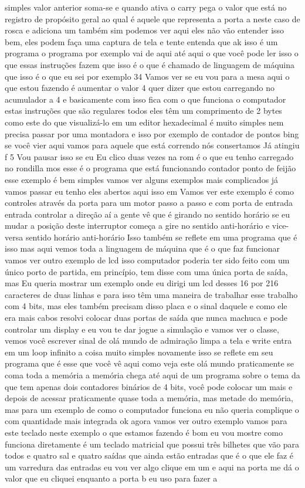 \documentclass[oneside,11pt]{memoir} %
\begin{document}
simples  valor anterior soma-se e quando  ativa o carry pega o valor que está  no registro de propósito geral ao qual é  aquele que representa a porta a neste  caso de rosca e adiciona um também  sim podemos ver aqui  eles não vão entender isso bem, eles podem  faça uma captura de tela e tente  entenda que ak isso é um  programa o programa por exemplo vai de  aqui até aqui o que você pode ler isso  o que essas instruções fazem que isso é  o que é chamado de linguagem de máquina  que isso é o que eu sei por exemplo 34  Vamos ver se eu vou para a mesa aqui  o que estou fazendo é aumentar o valor  4 quer dizer que estou carregando no  acumulador a 4 e basicamente com isso fica  com o que funciona o computador  estas instruções que são regulares  todos eles têm um comprimento de 2 bytes como este  do que visualizá-lo em um editor hexadecimal é  muito simples nem precisa  passar por uma montadora e isso por  exemplo de contador de pontos bing se você vier aqui  vamos para aquele que está correndo nós consertamos  Já atingiu f 5 Vou pausar isso se eu  Eu clico duas vezes na rom é o que eu tenho  carregado no rondilla mos esse é o  programa que está funcionando contador  ponto de feijão  esse exemplo é bem simples vamos ver  alguns exemplos mais complicados já  vamos passar eu tenho eles abertos aqui isso em  Vamos ver este exemplo é como  controles através da porta para um motor  passo a passo  e com porta de entrada entrada  controlar a direção aí a gente vê que é  girando no sentido horário se eu mudar  a posição deste interruptor começa a  gire no sentido anti-horário e vice-versa  sentido horário anti-horário  Isso também se reflete em uma  programa que é isso mas aqui vemos  toda a linguagem de máquina que é o que  faz funcionar  vamos ver outro exemplo de lcd isso  computador poderia ter sido feito com um  único porto de partida, em princípio, tem  disse com uma única porta de saída, mas  Eu queria mostrar um exemplo onde eu dirigi  um lcd desses 16 por 216 caracteres  de duas linhas e para isso têm  uma maneira de trabalhar esse trabalho  com 4 bits, mas eles também precisam disso  placa  e o sinal daquele e como ele era mais  cabos resolvi colocar duas portas de  saída que nunca machuca e pode  controlar um display e eu vou te dar  jogue a simulação e vamos ver o  classe, vemos você escrever sinal de olá mundo  de admiração limpa a tela e  write entra em um loop infinito a  coisa muito simples  novamente isso se reflete em seu  programa que é esse que você vê aqui como  veja este olá mundo praticamente se  coma toda a memória a memória chega  até aqui de um programa sobre o tema da  que tem apenas dois contadores  binários de 4 bits, você pode colocar um  mais e depois de acessar praticamente  quase toda a memória, mas metade do  memória, mas para um exemplo  de como o computador funciona eu não queria  complique o com quantidade mais integrada  ok agora vamos ver outro exemplo  vamos para este teclado neste exemplo  o que estamos fazendo é bom eu vou  mostre como funciona diretamente  é um teclado matricial que possui três  bilhetes que vão para todos e quatro  sal e quatro saídas que ainda estão  entradas que é o que ele faz é um  varredura das entradas eu vou ver  algo clique em um e aqui na porta  me dá o valor que eu cliquei  enquanto a porta b eu uso para fazer  a 
\end{document}
